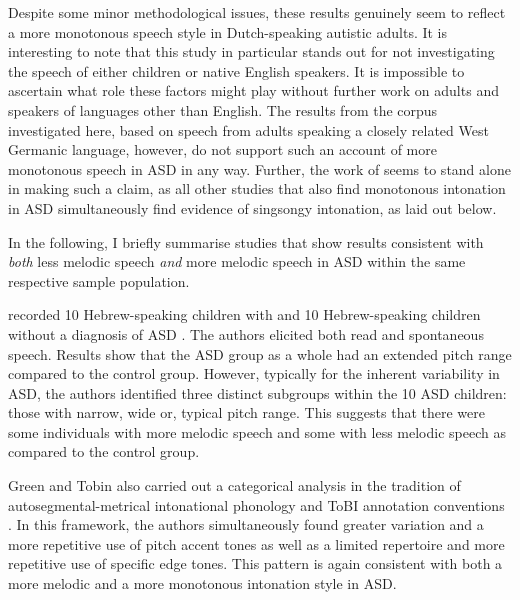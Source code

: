 Despite some minor methodological issues, these results genuinely seem to reflect a more monotonous speech style in Dutch-speaking autistic adults. It is interesting to note that this study in particular stands out for not investigating the speech of either children or native English speakers. It is impossible to ascertain what role these factors might play without further work on adults and speakers of languages other than English. The results from the corpus investigated here, based on speech from adults speaking a closely related West Germanic language, however, do not support such an account of more monotonous speech in ASD in any way. Further, the work of \citet{kalandAccountingListenerComparing2013} seems to stand alone in making such a claim, as all other studies that also find monotonous intonation in ASD simultaneously find evidence of singsongy intonation, as laid out below.

	\label{int_back_ASD_mixed}

In the following, I briefly summarise studies that show results consistent with \emph{both} less melodic speech \emph{and} more melodic speech in ASD within the same respective sample population.

\citet{greenProsodicAnalysisDifficult2009} recorded 10 Hebrew-speaking children with and 10 He\-brew-speaking children without a diagnosis of ASD \citep[see also][]{greenIntonationHebrewspeakingChildren2009}. The authors elicited both read and spontaneous speech. Results show that the ASD group as a whole had an extended pitch range compared to the control group. However, typically for the inherent variability in ASD, the authors identified three distinct subgroups within the 10 ASD children: those with narrow, wide or, typical pitch range. This suggests that there were some individuals with more melodic speech and some with less melodic speech as compared to the control group.

Green and Tobin also carried out a categorical analysis in the tradition of auto\-segmental-metrical intonational phonology and ToBI annotation conventions \citep{beckmanOriginalToBISystem2004,greenIntonationHebrewSpeaking2008}. In this framework, the authors simultaneously found greater variation and a more repetitive use of pitch accent tones as well as a limited repertoire and more repetitive use of specific edge tones. This pattern is again consistent with both a more melodic and a more monotonous intonation style in ASD.


